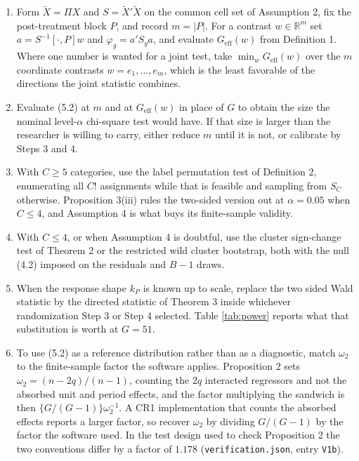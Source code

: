 \documentclass[12pt]{article}
\theoremstyle{definition}
\numberwithin{equation}{section}
\begin{document}
\begin{enumerate}
\item Form $\tilde{X} = \Pi X$ and $S = \tilde{X}'\tilde{X}$ on the common cell set
of Assumption 2, fix the post-treatment block $P$, and record
$m = |P|$. For a contrast $w \in \mathbb{R}^m$ set $a = S^{-1}[\cdot,P]w$ and
$\varphi_g = a'S_g a$, and evaluate $G_{\mathrm{eff}}(w)$ from Definition
1. Where one number is wanted for a joint test, take
$\min_w G_{\mathrm{eff}}(w)$ over the $m$ coordinate contrasts
$w = e_1,\dots,e_m$, which is the least favorable of the directions the joint
statistic combines.
\item Evaluate (5.2) at $m$ and at $G_{\mathrm{eff}}(w)$ in place of $G$ to obtain the size the
nominal level-$\alpha$ chi-square test would have. If that size is larger than the researcher is willing
to carry, either reduce $m$ until it is not, or calibrate by Steps 3 and 4.

\item With $C \ge 5$ categories, use the label permutation test of Definition
2, enumerating all $C!$ assignments while that is feasible and
sampling from $S_C$ otherwise. Proposition 3(iii) rules the
two-sided version out at $\alpha = 0.05$ when $C \le 4$, and Assumption
4 is what buys its finite-sample validity.

\item With $C \le 4$, or when Assumption 4 is doubtful, use the
cluster sign-change test of Theorem 2 or the restricted wild
cluster bootstrap, both with the null (4.2) imposed on the residuals
and $B-1$ draws.

\item When the response shape $k_P$ is known up to scale, replace the two sided
Wald statistic by the directed statistic of Theorem 3 inside
whichever randomization Step 3 or Step 4 selected. Table \ref{tab:power} reports
what that substitution is worth at $G = 51$.

\item To use (5.2) as a reference distribution rather than as a
diagnostic, match $\omega_2$ to the finite-sample factor the software applies.
Proposition 2 sets $\omega_2 = (n-2q)/(n-1)$, counting the $2q$
interacted regressors and not the absorbed unit and period effects, and the
factor multiplying the sandwich is then $\{G/(G-1)\}\omega_2^{-1}$. A CR1
implementation that counts the absorbed effects reports a larger factor, so
recover $\omega_2$ by dividing $G/(G-1)$ by the factor the software used. In the
test design used to check Proposition 2 the two conventions
differ by a factor of $1.178$ (\texttt{verification.json}, entry \texttt{V1b}).
\end{enumerate}
\end{document}

